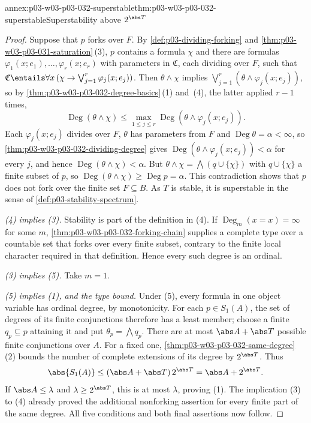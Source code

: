 \begin{annexitem}{annex:p03-w03-p03-032-superstable}{thm:p03-w03-p03-032-superstable}{Superstability above \(2^{\abs T}\)}
\begin{proof}
Suppose that \(p\) forks over \(F\).  By \cref{def:p03-dividing-forking} and
\cref{thm:p03-w03-p03-031-saturation}\,(3), \(p\) contains a formula
\(\chi\) and there are formulas \(\varphi_1(x;e_1),\ldots,\varphi_r(x;e_r)\)
with parameters in \(\mathfrak C\), each dividing over \(F\), such that
\(\mathfrak C\entails\forall x\,(\chi\to\bigvee_{j=1}^r\varphi_j(x;e_j))\).
Then \(\theta\wedge\chi\) implies
\(\bigvee_{j=1}^r(\theta\wedge\varphi_j(x;e_j))\), so by
\cref{thm:p03-w03-p03-032-degree-basics}\,(1) and~(4), the latter applied
\(r-1\) times,
\[
  \operatorname{Deg}(\theta\wedge\chi)\leq
  \max_{1\leq j\leq r}\operatorname{Deg}(\theta\wedge\varphi_j(x;e_j)).
\]
Each \(\varphi_j(x;e_j)\) divides over \(F\), \(\theta\) has parameters from
\(F\) and \(\operatorname{Deg}\theta=\alpha<\infty\), so
\cref{thm:p03-w03-p03-032-dividing-degree} gives
\(\operatorname{Deg}(\theta\wedge\varphi_j(x;e_j))<\alpha\) for every
\(j\), and hence \(\operatorname{Deg}(\theta\wedge\chi)<\alpha\).  But
\(\theta\wedge\chi=\bigwedge(q\cup\{\chi\})\) with \(q\cup\{\chi\}\) a finite
subset of \(p\), so \(\operatorname{Deg}(\theta\wedge\chi)\geq
\operatorname{Deg}p=\alpha\).  This contradiction shows that \(p\) does not
fork over the finite set \(F\subseteq B\).  As \(T\) is stable, it is
superstable in the sense of \cref{def:p03-stability-spectrum}.

\emph{(4) implies (3).}  Stability is part of the definition in (4).
If \(\operatorname{Deg}_m(x=x)=\infty\) for some \(m\),
\cref{thm:p03-w03-p03-032-forking-chain} supplies a complete type over a
countable set that forks over every finite subset, contrary to the finite
local character required in that definition.  Hence every such degree is
an ordinal.

\emph{(3) implies (5).}  Take \(m=1\).

\emph{(5) implies (1), and the type bound.}  Under (5), every formula in
one object variable has ordinal degree, by monotonicity.  For each
\(p\in S_1(A)\), the set of degrees of its finite conjunctions therefore
has a least member; choose a finite \(q_p\subseteq p\) attaining it and
put \(\theta_p=\bigwedge q_p\).  There are at most
\(\abs A+\abs T\) possible finite conjunctions over \(A\).  For a fixed
one, \cref{thm:p03-w03-p03-032-same-degree}\,(2) bounds the number of
complete extensions of its degree by \(2^{\abs T}\).  Thus
\[
 \abs{S_1(A)}\leq(\abs A+\abs T)\,2^{\abs T}
                   =\abs A+2^{\abs T}.
\]
If \(\abs A\leq\lambda\) and \(\lambda\geq2^{\abs T}\), this is at
most \(\lambda\), proving (1).  The implication (3) to (4) already proved
the additional nonforking assertion for every finite part of the same
degree.  All five conditions and both final assertions now follow.

\end{proof}
\end{annexitem}

